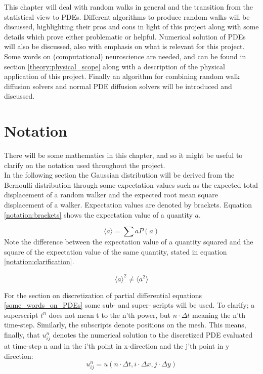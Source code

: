 
This chapter will deal with random walks in general and the transition from the statistical view to PDEs. 
Different algorithms to produce random walks will be discussed, highlighting their pros and cons in light of this project along with some details which prove either problematic or helpful. 
Numerical solution of PDEs will also be discussed, also with emphasis on what is relevant for this project. 
Some words on (computational) neuroscience are needed, and can be found in section \ref{theory:physical_scope} along with a description of the physical application of this project. 
Finally an algorithm for combining random walk diffusion solvers and normal PDE diffusion solvers will be introduced and discussed.

\section{Notation}

There will be some mathematics in this chapter, and so it might be useful to clarify on the notation used throughout the project.\\

In the following section the Gaussian distribution will be derived from the Bernoulli distribution through some expectation values such as the expected total displacement of a random walker and the expected root mean square displacement of a walker. 
Expectation values are denoted by brackets. Equation \eqref{notation:brackets} shows the expectation value of a quantity $a$. 

\begin{equation}\label{notation:brackets}
 \langle a \rangle = \sum aP(a)
\end{equation}
Note the difference between the expectation value of a quantity squared and the square of the expectation value of the same quantity, stated in equation \ref{notation:clarification}.

\begin{equation}\label{notation:clarification}
 \langle a \rangle^2 \neq \langle a^2 \rangle
\end{equation}

For the section on discretization of partial differential equations \ref{some_words_on_PDEs} some sub- and super- scripts will be used. 
To clarify; a superscript $t^n$ does not mean t to the n'th power, but $n\cdot\Delta t$ meaning the n'th time-step. 
Similarly, the subscripts denote positions on the mesh. This means, finally, that $u^n_{ij}$ denotes the numerical solution to the discretized PDE evaluated at time-step n and in the i'th point in x-direction and the j'th point in y direction:
\begin{equation*}
 u^n_{ij} = u(n\cdot\Delta t,i\cdot\Delta x, j\cdot\Delta y)
\end{equation*}

